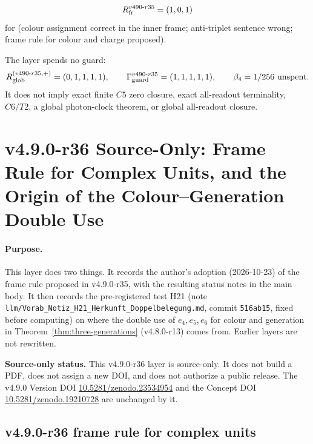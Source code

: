 \[
R_{\rm fr}^{v490\text{-}r35}=(1,0,1)
\]
for (colour assignment correct in the inner frame; anti-triplet sentence wrong; frame rule for colour and charge proposed).

The layer spends no guard:
\[
R_{\rm glob}^{(v490\text{-}r35,+)}=(0,1,1,1,1),
\qquad
\Gamma_{\rm guard}^{v490\text{-}r35}=(1,1,1,1,1),
\qquad
\beta_4=1/256\ \text{unspent}.
\]
It does not imply exact finite \(C5\) zero closure, exact all-readout terminality,
\(C6/T2\), a global photon-clock theorem, or global all-readout closure.
\clearpage
\section*{v4.9.0-r36 Source-Only: Frame Rule for Complex Units, and the Origin of the Colour--Generation Double Use}
\label{sec:v490-r36-unit-rule-double-use}

\paragraph{Purpose.}
This layer does two things.  It records the author's adoption (2026-10-23) of the frame rule proposed in v4.9.0-r35, with the
resulting status notes in the main body.  It then records the pre-registered test H21 (note
\texttt{llm/Vorab\_Notiz\_H21\_Herkunft\_Doppelbelegung.md}, commit \texttt{516ab15}, fixed before computing) on where the double use
of \(e_4,e_5,e_6\) for colour and generation in Theorem~\ref{thm:three-generations} (v4.8.0-r13) comes from.  Earlier layers are not
rewritten.

\noindent\textbf{Source-only status.}
This v4.9.0-r36 layer is source-only.  It does not build a PDF, does not assign a new DOI,
and does not authorize a public release.  The v4.9.0 Version DOI
\href{https://doi.org/10.5281/zenodo.23534954}{10.5281/zenodo.23534954} and the Concept DOI
\href{https://doi.org/10.5281/zenodo.19210728}{10.5281/zenodo.19210728} are unchanged by it.

\subsection*{v4.9.0-r36 frame rule for complex units}
\label{subsec:v490-r36-unit-rule}

